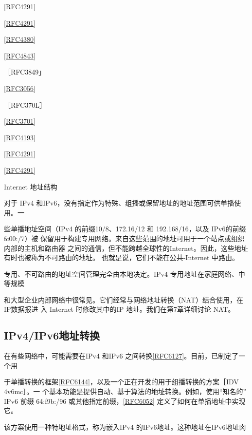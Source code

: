 \href{https://www.rfc-editor.org/rfc/rfc4291}{[RFC4291]}

\href{https://www.rfc-editor.org/rfc/rfc4291}{[RFC4291]}

\href{https://www.rfc-editor.org/rfc/rfc4380}{[RFC4380]}

\href{https://www.rfc-editor.org/rfc/rfc4843}{[RFC4843]}

［RFC3849」

\href{https://www.rfc-editor.org/rfc/rfc3056}{[RFC3056]}

［RFC370L］

\href{https://www.rfc-editor.org/rfc/rfc3701}{[RFC3701]}

\href{https://www.rfc-editor.org/rfc/rfc4193}{[RFC4193]}

\href{https://www.rfc-editor.org/rfc/rfc4291}{[RFC4291]}

\href{https://www.rfc-editor.org/rfc/rfc4291}{[RFC4291]}

Internet 地址结构

对于 IPv4 和IPv6，没有指定作为特殊、组播或保留地址的地址范围可供单播使用。一

些单播地址空间（IPv4 的前缀10/8、172.16/12 和 192.168/16，以及 IPv6的前缀 fc00:/7）被
保留用于构建专用网络。来自这些范围的地址可用于一个站点或组织内部的主机和路由器
之间的通信，但不能跨越全球性的Internet。因此，这些地址有时也被称为不可路由的地址。
也就是说，它们不能在公共-Internet 中路由。

专用、不可路由的地址空间管理完全由本地决定。IPv4 专用地址在家庭网络、中等规模

和大型企业内部网络中很常见。它们经常与网络地址转换（NAT）结合使用，在IP数据报进
入 Internet 时修改其中的IP 地址。我们在第7章详细讨论 NAT。

\subsection{IPv4/IPv6地址转换}
在有些网络中，可能需要在IPv4 和IPv6 之间转换\href{https://www.rfc-editor.org/rfc/rfc6127}{[RFC6127]}。目前，已制定了一个用

于单播转换的框架\href{https://www.rfc-editor.org/rfc/rfc6144}{[RFC6144]}，以及一个正在开发的用于组播转换的方案［IDV 4v6mc］。一
个基本功能是提供自动、基于算法的地址转换。例如，使用“知名的” IPv6 前缀 64:f9b:/96
或其他指定前缀，\href{https://www.rfc-editor.org/rfc/rfc6052}{[RFC6052]} 定义了如何在单播地址中实现它。

该方案使用一种特地址格式，称为嵌入IPv4 的IPv6地址。这种地址在IPv6地址肉

